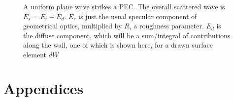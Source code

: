 \documentclass{article}
\numberwithin{equation}{section}
\begin{document}
\begin{figure}[H]
\begin{center}
            \caption{A uniform plane wave strikes a PEC. The overall scattered wave is $E_s = E_r + E_d$. $E_r$ is just the usual specular component of geometrical optics, multiplied by $R$, a roughness parameter. $E_d$ is the diffuse component, which will be a sum/integral of contributions along the wall, one of which is shown here, for a drawn surface element $dW$}
            \label{fig:planeWavePEC}
            \end{center}
            \end{figure}

    \newpage
    \renewcommand{\thesubsection}{\Alph{subsection}}
    \appendix
    \section*{Appendices}
\end{document}
